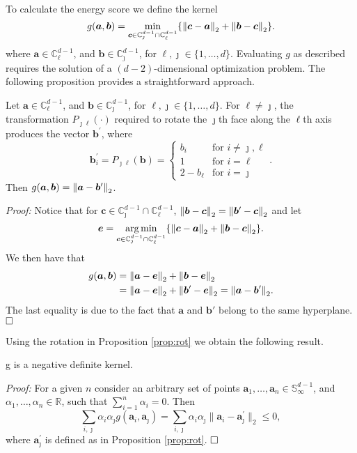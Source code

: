 To calculate the energy score we define the kernel 
    \[  
    g(\bm{a},\bm{b}) = \min_{\bm{c} \in{\mathbb C}_{\jmath}^{d-1}\cap{\mathbb C}_{\ell}^{d-1}}\left\{ 
        \pnorm{\bm{c}-\bm{a}}{2} + \pnorm{\bm{b}-\bm{c}}{2} \right\}.
    \]
    where $\bm{a} \in {\mathbb C}_{\ell}^{d-1}$, and 
    $\bm{b} \in {\mathbb   C}_{\jmath}^{d-1}$, for $\ell,\jmath\in \{1,\ldots, d\}$.
Evaluating $g$ as described requires the solution of a $(d-2)$-dimensional 
  optimization problem.  The following proposition provides a straightforward approach.
\begin{prop}\label{prop:rot}
    Let $\bm{a} \in {\mathbb C}_{\ell}^{d-1}$, and $\bm{b} \in {\mathbb C}_{\jmath}^{d-1}$, 
        for $\ell, \jmath \in \{1, \ldots , d\}$.  For $\ell\neq \jmath$, the 
  transformation $P_{\jmath\ell}(\cdot)$ required to rotate the $\jmath$th face along the 
  $\ell$th axis produces the vector $\bm{b}^\prime$, where
  \begin{equation}
    \label{eqn:rotation}
     \bm{b}^{\prime}_i = P_{\jmath\ell}(\bm{b}) = 
    \begin{cases}
        b_{i} &\text{for }i\neq \jmath,\ell\\
        1 &\text{for }i = \ell\\
        2 - b_{\ell} &\text{for }i = \jmath
    \end{cases}.
  \end{equation}
  Then $g(\bm{a},\bm{b}) = \pnorm{\bm{a} - \bm{b}^{\prime}}{2}$.
\end{prop}
{\em Proof:}
Notice that for 
  $\bm{c} \in {\mathbb C}_{\jmath}^{d-1}\cap{\mathbb C}_{\ell}^{d-1}$,
     $\pnorm{\bm{b} - \bm{c}}{2} =  \pnorm{\bm{b}^{\prime} - \bm{c}}{2}$ and let
\[\bm{e} = 
    \argmin_{\bm{c} \in{\mathbb C}_{\jmath}^{d-1}\cap{\mathbb C}_{\ell}^{d-1}}\left\{ 
        \pnorm{\bm{c}-\bm{a}}{2} + \pnorm{\bm{b}-\bm{c}}{2} \right\}.
\]
We then have that
  \begin{equation*}
    \begin{aligned}
    g(\bm{a}, \bm{b}) &= \pnorm{\bm{a} - \bm{e}}{2} + \pnorm{\bm{b} - \bm{e}}{2}\\
    &= \pnorm{\bm{a} - \bm{e}}{2} + \pnorm{\bm{b}^{\prime} 
        - \bm{e}}{2} = \pnorm{\bm{a} - \bm{b}^{\prime}}{2}.
    \end{aligned}
  \end{equation*}
  The last equality is due to the fact that $\bm{a}$ and $\bm{b}'$ belong to the 
  same hyperplane. $\hfill\Box$
    
Using the rotation in Proposition \ref{prop:rot} we obtain the following result.
    \begin{prop}\label{prop:g}
    g is a negative definite kernel.
    \end{prop}
    {\em Proof:} For a given $n$ consider an arbitrary set of points
    $\bm{a}_1, \ldots , \bm{a}_n \in {\mathbb S}_\infty^{d-1}$, and 
    $\alpha_1, \ldots , \alpha_n \in {\mathbb R}$, such that $\sum_{i=1}^n
    \alpha _i = 0$. Then
    \[
    \sum_{i,\jmath} \alpha_i \alpha_\jmath g(\bm{a}_i, \bm{a}_\jmath) 
        = \sum_{i,\jmath} \alpha_i \alpha_\jmath 
    \|\bm{a}_i - \bm{a}_\jmath^\prime\|_2 \leq 0,
    \]
    where $\bm{a}_\jmath^\prime$ is defined as in Proposition \ref{prop:rot}. $\hfill\Box$

